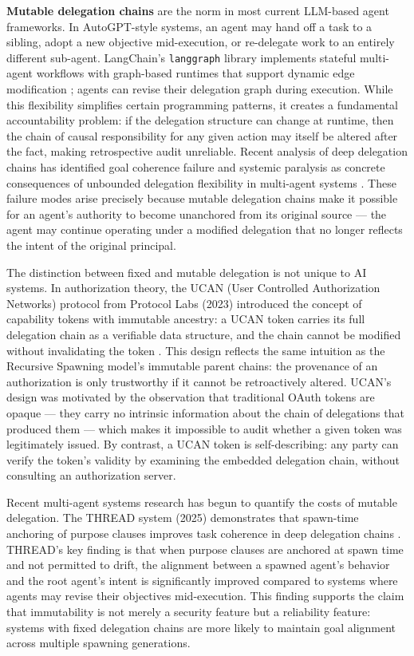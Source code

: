 {{\textbf{Mutable delegation chains} are the norm in most current LLM-based agent frameworks. In AutoGPT-style systems, an agent may hand off a task to a sibling, adopt a new objective mid-execution, or re-delegate work to an entirely different sub-agent. LangChain's \texttt{langgraph} library implements stateful multi-agent workflows with graph-based runtimes that support dynamic edge modification \cite{heavybit2025multiagent}; agents can revise their delegation graph during execution. While this flexibility simplifies certain programming patterns, it creates a fundamental accountability problem: if the delegation structure can change at runtime, then the chain of causal responsibility for any given action may itself be altered after the fact, making retrospective audit unreliable. Recent analysis of deep delegation chains has identified goal coherence failure and systemic paralysis as concrete consequences of unbounded delegation flexibility in multi-agent systems \cite{multi_agent_coordination_failures}. These failure modes arise precisely because mutable delegation chains make it possible for an agent's authority to become unanchored from its original source — the agent may continue operating under a modified delegation that no longer reflects the intent of the original principal.

The distinction between fixed and mutable delegation is not unique to AI systems. In authorization theory, the UCAN (User Controlled Authorization Networks) protocol from Protocol Labs (2023) introduced the concept of capability tokens with immutable ancestry: a UCAN token carries its full delegation chain as a verifiable data structure, and the chain cannot be modified without invalidating the token \cite{UCAN}. This design reflects the same intuition as the Recursive Spawning model's immutable parent chains: the provenance of an authorization is only trustworthy if it cannot be retroactively altered. UCAN's design was motivated by the observation that traditional OAuth tokens are opaque — they carry no intrinsic information about the chain of delegations that produced them — which makes it impossible to audit whether a given token was legitimately issued. By contrast, a UCAN token is self-describing: any party can verify the token's validity by examining the embedded delegation chain, without consulting an authorization server.

Recent multi-agent systems research has begun to quantify the costs of mutable delegation. The THREAD system (2025) demonstrates that spawn-time anchoring of purpose clauses improves task coherence in deep delegation chains \cite{thread2025}. THREAD's key finding is that when purpose clauses are anchored at spawn time and not permitted to drift, the alignment between a spawned agent's behavior and the root agent's intent is significantly improved compared to systems where agents may revise their objectives mid-execution. This finding supports the claim that immutability is not merely a security feature but a reliability feature: systems with fixed delegation chains are more likely to maintain goal alignment across multiple spawning generations.

}}
